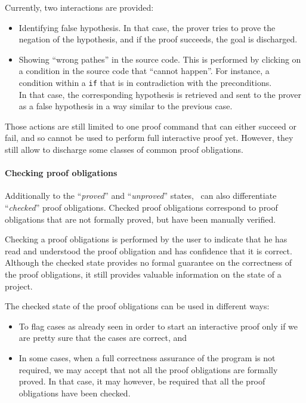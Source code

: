 Currently, two interactions are provided:
\begin{itemize}
\item Identifying false hypothesis. In that case, the prover tries to
    prove the negation of the hypothesis, and if the proof succeeds,
    the goal is discharged.
\item Showing ``wrong pathes'' in the source code. This is performed
    by clicking on a condition in the source code that ``cannot
    happen''. For instance, a condition within a {\tt if} that is in
    contradiction with the preconditions. \\ In that case, the
    corresponding hypothesis is retrieved and sent to the prover as a
    false hypothesis in a way similar to the previous case.
\end{itemize}
Those actions are still limited to one proof command that can either
succeed or fail, and so cannot be used to perform full interactive
proof yet.
However, they still allow to discharge some classes of common  proof
obligations.
\paragraph{Checking proof obligations}
Additionally to the ``\textit{proved}'' and ``\textit{unproved}''
states, \JACK\ can also differentiate ``\textit{checked}'' proof
obligations. Checked proof obligations correspond to proof obligations
that are not formally proved, but have been manually verified.

Checking a proof obligations is performed by the user to indicate that
he has read and understood the proof obligation and has confidence
that it is correct. Although the checked state provides no formal
guarantee on the correctness of the proof obligations, it still
provides valuable information on the state of a project.

The checked state of the proof obligations can be used in different
ways:
\begin{itemize}
\item To flag cases as already seen in order to start an interactive
   proof only if we are pretty sure that the cases are correct, and
\item In some cases, when a full correctness assurance of the program is not
   required, we may accept that not all the proof obligations are
   formally proved. In that case, it may however, be required that all
   the proof obligations have been checked.
\end{itemize}
